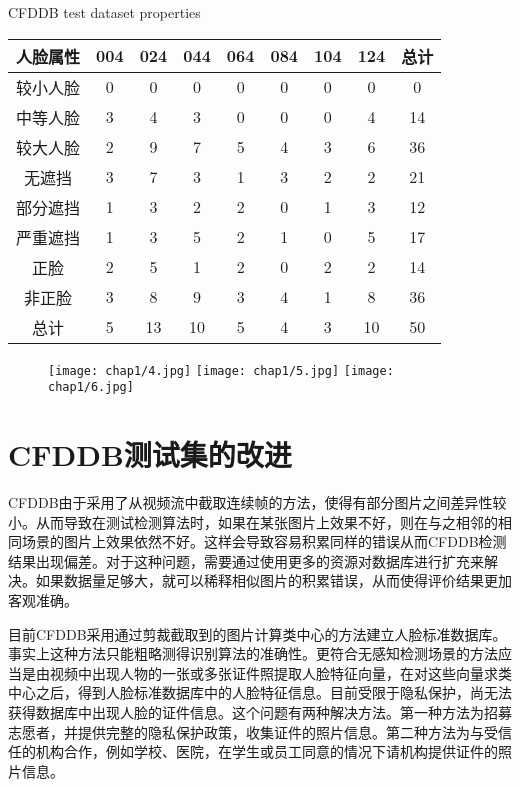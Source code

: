 \begin{table}[!hpb]
	\centering
	{CFDDB test dataset properties}
	\label{tab:cfddbal}
	\begin{tabular}{ c | ccccccc | c }
		\hline
		人脸属性 & 004 & 024 & 044 & 064 & 084 & 104 & 124 & 总计\\
		\hline
		较小人脸 & 0 & 0 & 0 & 0 & 0 & 0 & 0 & 0\\
		中等人脸 & 3 & 4 & 3 & 0 & 0 & 0 & 4 & 14\\
		较大人脸 & 2 & 9 & 7 & 5 & 4 & 3 & 6 & 36\\
		无遮挡   & 3 & 7 & 3 & 1 & 3 & 2 & 2 & 21\\
		部分遮挡 & 1 & 3 & 2 & 2 & 0 & 1 & 3 & 12\\
		严重遮挡 & 1 & 3 & 5 & 2 & 1 & 0 & 5 & 17\\
		正脸     & 2 & 5 & 1 & 2 & 0 & 2 & 2 & 14\\
		非正脸   & 3 & 8 & 9 & 3 & 4 & 1 & 8 & 36\\
		\hline
		总计 & 5 & 13 & 10 & 5 & 4 & 3 & 10 & 50\\
		\hline
	\end{tabular}
\end{table}

\begin{figure}[!htp]
	\centering
	{\texttt{[image: chap1/4.jpg]}}
	\hspace{4em}
	{\texttt{[image: chap1/5.jpg]}}
	\hspace{4em}
	{\texttt{[image: chap1/6.jpg]}}
	\label{fig:cfddbeval}
\end{figure}

\section{CFDDB测试集的改进}

CFDDB由于采用了从视频流中截取连续帧的方法，使得有部分图片之间差异性较小。从而导致在测试检测算法时，如果在某张图片上效果不好，则在与之相邻的相同场景的图片上效果依然不好。这样会导致容易积累同样的错误从而CFDDB检测结果出现偏差。对于这种问题，需要通过使用更多的资源对数据库进行扩充来解决。如果数据量足够大，就可以稀释相似图片的积累错误，从而使得评价结果更加客观准确。

目前CFDDB采用通过剪裁截取到的图片计算类中心的方法建立人脸标准数据库。事实上这种方法只能粗略测得识别算法的准确性。更符合无感知检测场景的方法应当是由视频中出现人物的一张或多张证件照提取人脸特征向量，在对这些向量求类中心之后，得到人脸标准数据库中的人脸特征信息。目前受限于隐私保护，尚无法获得数据库中出现人脸的证件信息。这个问题有两种解决方法。第一种方法为招募志愿者，并提供完整的隐私保护政策，收集证件的照片信息。第二种方法为与受信任的机构合作，例如学校、医院，在学生或员工同意的情况下请机构提供证件的照片信息。

